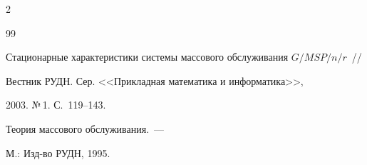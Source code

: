 \begin{multicols}{2}
{{\begin{thebibliography}{99}


Стационарные характеристики системы массового обслуживания $G/MSP/n/r$~//


Вестник РУДН. Сер. <<Прикладная математика и информатика>>,


2003. №\,1. С.~119--143.








\label{end\stat}












Теория массового обслуживания.~---


М.: Изд-во РУДН, 1995.


 \end{thebibliography}


}


}


\end{multicols}


 


